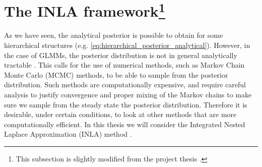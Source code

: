



\section{The INLA framework\protect\footnote{This subsection is slightly modified from the project thesis \citep{Arnstad}.}}
\label{sec:INLA_framework}
As we have seen, the analytical posterior is possible to obtain for some hierarchical structures (e.g. \eqref{eq:hierarchical_posterior_analytical}). 
However, in the case of GLMMs, the posterior distribution is not in general analytically tractable \citep{fong2010bayesian}. This calls for the use of numerical methods, such as Markov Chain Monte Carlo (MCMC) methods, to be able to sample from the posterior distribution. 
Such methods are computationally expensive, and require careful analysis to justify convergence and proper mixing of the Markov chains to make sure we sample from the steady state the posterior distribution. Therefore it is desirable, under certain conditions, to look at other methods that are more computationally efficient.
In this thesis we will consider the Integrated Nested Laplace Approximation (INLA) method \citep{gomezrubio2020inla}.
